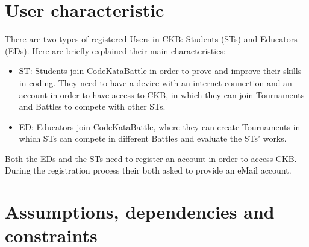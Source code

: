 \section{User characteristic}
\label{sec:User_characteristic}%
There are two types of registered Users in CKB: Students (STs) and Educators (EDs). Here are briefly explained their main characteristics:
\begin{itemize}
    \item ST: Students join CodeKataBattle in order to prove and improve their skills in coding. They need to have a device with an internet connection and an account in order to have access to CKB, in which they can join Tournaments and Battles to compete with other STs.  
    \item ED: Educators join CodeKataBattle, where they can create Tournaments in which STs can compete in different Battles and evaluate the STs’ works.
\end{itemize}
Both the EDs and the STs need to register an account in order to access CKB. During the registration process their both asked to provide an eMail account.

\section{Assumptions, dependencies and constraints}
\label{sec:assumptions_dependencies_constraints}%

